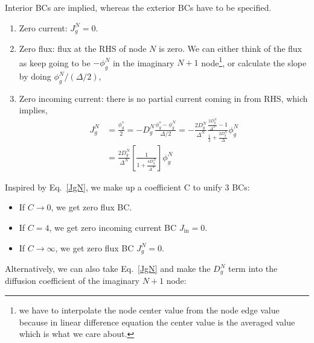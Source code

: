 \documentclass{school-22.211-notes}
\begin{document}
\clearpage
{}
Interior BCs are implied, whereas the exterior BCs have to be specified. 
\begin{enumerate}
\item Zero current: $J_g^N = 0$. 

\item Zero flux: flux at the RHS of node $N$ is zero.  We can either think of the flux as keep going to be $-\phi_g^N$ in the imaginary $N+1$ node\footnote{we have to interpolate the node center value from the node edge value because in linear difference equation the center value is the averaged value which is what we care about.}, or calculate the slope by doing $\phi_g^N / (\Delta /2)$,

\item Zero incoming current: there is no partial current coming in from RHS,
which implies,
\begin{align}
  J_g^N &= \frac{\phi_g^s}{2} = -D_g^N \frac{\phi_g^s - \phi_g^N}{\Delta/2} = - \frac{2 D_g^N}{\Delta^N} \frac{\frac{2D_g^N}{\Delta^N} - 1}{\frac{1}{2} + \frac{2D_g^N}{\Delta}} \phi_g^N \\
  &= \frac{2D_g^N}{\Delta^N} \left[ \frac{1}{1 + \frac{4 D_g^{N}}{\Delta^N}} \right] \phi_g^N  \label{JgN}
\end{align}
\end{enumerate}

Inspired by Eq.~\ref{JgN}, we make up a coefficient C to unify 3 BCs: 
\begin{itemize}
\item If $C \to 0$, we get zero flux BC.  
\item If $C = 4$, we get zero incoming current BC $J_{\mathrm{in}} = 0$.
\item If $C \to \infty$, we get zero flux BC $J_g^N = 0$. 
\end{itemize}

Alternatively, we can also take Eq.~\ref{JgN} and make the $D_g^N$ term into the diffusion coefficient of the imaginary $N+1$ node: 
\end{document}
